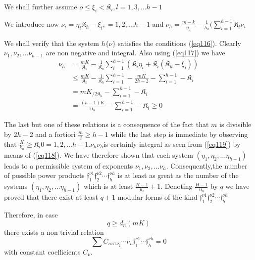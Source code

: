 We shall further assume $o \leq  \xi_i  < \mathfrak{K}_i, l= 1,3 ,\ldots
h-1$ 

We introduce now $\nu_i = \eta_i \mathfrak{K}_h  - \xi_i, = 1,2, \ldots
h-1$ and $\nu_h = \frac{m-k}{\eta_n} - \frac{1}{h_k}(\sum^{h-1}_{i=1}
\mathfrak{K}_i \nu_i$  

We shall verify that the system $h\{\nu \}$ satisfies the
conditions (\ref{eq116}). Clearly $\nu_1, \nu_2, \ldots \nu_{h-1}$ are
non negative and integral. Also using (\ref{eq117}) we have   
\begin{align*}
\nu_h & = \frac{m K}{\mathfrak{K}_h} - \frac{1}{\mathfrak{K}_h}
\sum^{h-1}_{i=1} (\mathfrak{K}_i \eta_i + \mathfrak{K}_i(\mathfrak{K}_h -
\xi_i )) \tag{119}\label{eq119} \\ 
& \leq \frac{m K}{\mathfrak{K}_h} - \frac{1}{\mathfrak{K}_h}
\sum^{h-1}_{i=1} - \frac{m K}{2 h-2}-\sum^{h-1}_{i=1}
-\mathfrak{K}_i\\ 
& =m K_{/2 \mathfrak{K}_h}- \sum^{h-1}_{i=1} -\mathfrak{K}_i \\ 
& = \frac{(h-1)K}{\mathfrak{K}_h} -\sum^{h-1}_{i=1} -\mathfrak{K}_i \geq 0
\end{align*}


\setcounter{pageoriginal}{86}
The last but one of these relations is a consequence of the fact that
$m$ is divisible by $2 h -2$ and a fortiori $\frac{m}{2} \geq h-1$
while the last step is immediate by observing that $\frac{K}{k_h}\geq
\mathfrak{K}_i 0 = 1,2, \ldots h-1. \nu_{h} \nu_h$\pageoriginale is certainly
integral as seen from (\ref{eq119}) by means of (\ref{eq118}). We have
therefore 
shown that each system $(\eta_1 , \eta_2 , \ldots \eta_{h-1})$ leads
to a permissible system of exponents $\nu_1 , \nu_2 , \ldots
\nu_{h}$. Consequently,the number of possible power products
$\mathfrak{f}^{\nu 1}_1 \mathfrak{f}^{\nu 2}_2 \cdots \mathfrak{f}^{\nu
  h}_h$ is at least as great as the number of the systems  $(\eta_1 ,
\eta_2 , \ldots \eta_{h-1})$ which is at least
$\frac{H-1}{\mathfrak{K}_h}+1$. Denoting $\frac{H-1}{\mathfrak{K}_h}$ by
$q$ we have proved that there exist at least $q+1$ modular forms of
the kind $\mathfrak{f}^{\nu 1}_1 \mathfrak{f}^{\nu 2}_2 \cdots
\mathfrak{f}^{\nu h}_h$  

Therefore, in case 
\begin{equation*}
q \geq d_n (mK) \tag{120}\label{eq120} 
\end{equation*}
there exists a non trivial relation
$$
\sum C_{nu 1 \nu_2 }\cdots \nu_{h} \mathfrak{f}^{\nu 1}_1 \cdots
\mathfrak{f}^{\nu h}_h = 0 
$$
with constant coefficients $C_{\nu}$.

